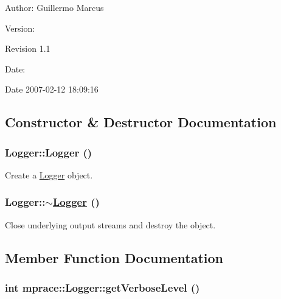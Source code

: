 \begin{Desc}
\item[Author:]Guillermo Marcus \end{Desc}
\begin{Desc}
\item[Version:]\begin{Desc}
\item[Revision]1.1 \end{Desc}
\end{Desc}
\begin{Desc}
\item[Date:]\begin{Desc}
\item[Date]2007-02-12 18:09:16 \end{Desc}
\end{Desc}




\subsection{Constructor \& Destructor Documentation}
\hypertarget{classmprace_1_1Logger_a0}{
\subsubsection[Logger]{\setlength{\rightskip}{0pt plus 5cm}Logger::Logger ()}}
\label{classmprace_1_1Logger_a0}


Create a \hyperlink{classmprace_1_1Logger}{Logger} object. 

\hypertarget{classmprace_1_1Logger_a1}{
\subsubsection[$\sim$Logger]{\setlength{\rightskip}{0pt plus 5cm}Logger::$\sim$\hyperlink{classmprace_1_1Logger}{Logger} ()}}
\label{classmprace_1_1Logger_a1}


Close underlying output streams and destroy the object. 



\subsection{Member Function Documentation}
\hypertarget{classmprace_1_1Logger_a2}{
\subsubsection[getVerboseLevel]{\setlength{\rightskip}{0pt plus 5cm}int mprace::Logger::get\-Verbose\-Level ()}}
\label{classmprace_1_1Logger_a2}


